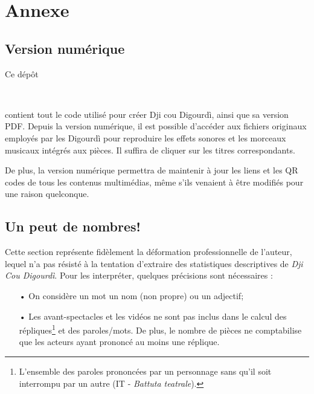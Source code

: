 \chapter*{Annexe}
\section*{Version numérique}\label{vers_num}
Ce dépôt
\begin{center}
\centering
\github\ \hspace*{0.5mm} \href{\detokenize{https://github.com/jbollon/Dji-cou-Digourdi}}{} \hspace*{0.5mm} \github\\
 \vspace*{2mm}
\end{center}
\noindent  contient tout le code utilisé pour créer Dji cou Digourdì, ainsi que sa version PDF. Depuis la version numérique, il est possible d'accéder aux fichiers originaux employés par les Digourdì pour reproduire les effets sonores et les morceaux musicaux intégrés aux pièces. Il suffira de cliquer sur les titres correspondants.

De plus, la version numérique permettra de maintenir à jour les liens et les QR codes de tous les contenus multimédias, même s'ils venaient à être modifiés pour une raison quelconque.

\section*{Un peut de nombres!}
Cette section représente fidèlement la déformation professionnelle de l'auteur, lequel n'a pas résisté à la tentation d'extraire des statistiques descriptives de \textit{Dji Cou Digourdì}. Pour les interpréter, quelques précisions sont nécessaires :
\begin{itemize}
\item[•] On considère un mot un nom (non propre) ou un adjectif;
\item[•] Les avant-spectacles et les vidéos ne sont pas inclus dans le calcul des répliques\footnote{ L'ensemble des paroles prononcées par un personnage sans qu'il soit interrompu par un autre (IT - \textit{Battuta teatrale}).} et des paroles/mots. De plus, le nombre de pièces ne comptabilise que les acteurs ayant prononcé au moins une réplique.
\end{itemize}